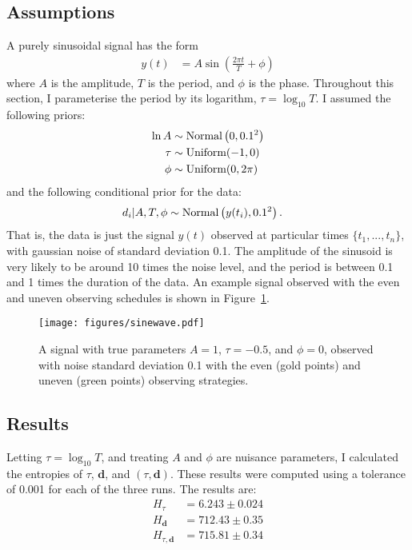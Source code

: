 \documentclass[entropy,article,accept,oneauthor,pdftex,10pt,a4paper]{mdpi}
\renewcommand{\d}{\boldsymbol{d}}
\begin{document}
\subsection{Assumptions}

A purely sinusoidal signal has the form
\begin{align}
y(t) &= A \sin \left(\frac{2\pi t}{T} + \phi\right)
\end{align}
where $A$ is the amplitude, $T$ is the period, and $\phi$ is the phase.
Throughout this section, I parameterise the period by its logarithm,
$\tau = \log_{10} T$. I assumed the following priors:
\begin{align}
\ln A   &\sim \textnormal{Normal}\left(0, 0.1^2\right)  \\
\tau    &\sim \textnormal{Uniform}(-1, 0)  \\
\phi    &\sim \textnormal{Uniform}(0, 2\pi)
\end{align}
and the following conditional prior for the data:
\begin{align}
d_i | A, T, \phi &\sim \textnormal{Normal}\left(y(t_i), 0.1^2\right).
\end{align}
That is, the data is just the signal $y(t)$ observed at particular times
$\{t_1, ..., t_n\}$, with gaussian noise of standard deviation 0.1.
The amplitude of the sinusoid is very likely to be around 10 times the
noise level, and the period is between 0.1 and 1 times the duration of
the data. An example signal observed with the even and uneven observing schedules
is shown in Figure~\ref{fig:sinewave}.

\begin{figure}[!ht]
\centering
\texttt{[image: figures/sinewave.pdf]}
\caption{A signal with true parameters $A=1$, $\tau=-0.5$, and
$\phi=0$, observed with noise standard deviation 0.1 with the
even (gold points) and uneven (green points) observing strategies.
\label{fig:sinewave}}
\end{figure}


\subsection{Results}

Letting $\tau = \log_{10} T$, and treating
$A$ and $\phi$ are nuisance parameters, I calculated the entropies
of $\tau$, $\d$, and $(\tau, \d)$.
These results were computed using a tolerance of 0.001 for each of the three
runs. The results are:
\begin{align}
H_{\tau}    &= 6.243  \pm 0.024 \\
H_{\d}      &= 712.43 \pm 0.35   \\
H_{\tau,\d} &= 715.81 \pm 0.34
\end{align}
\end{document}
